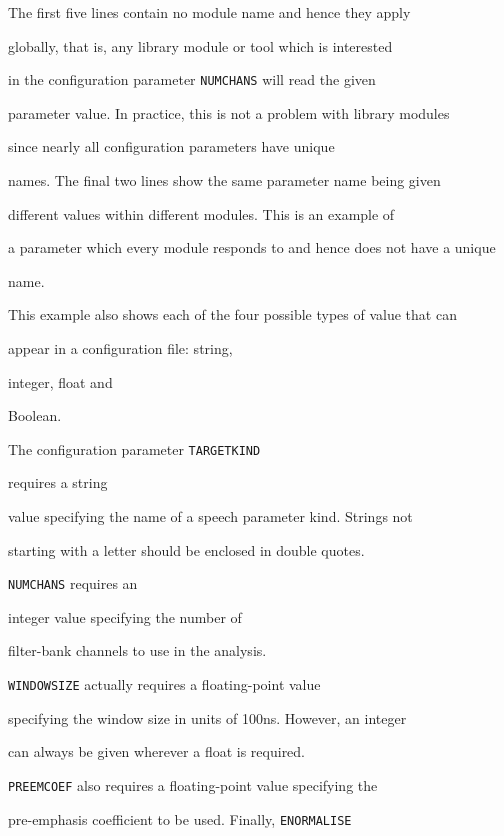 The first five lines contain no module name and hence they apply


globally, that is, any library module or tool which is interested


in the configuration parameter \texttt{NUMCHANS} will read the given


parameter value.  In practice, this is not a problem with library modules


since nearly all configuration parameters have unique


names.  The final two lines show the same parameter name being given


different values within different modules.  This is an example of


a parameter which every module responds to and hence does not have a unique


name.





This example also shows each of the four possible types of value that can


appear in a configuration file: string, 


integer, float and 


Boolean.


The configuration parameter \texttt{TARGETKIND}


 requires a string


value specifying the name of a speech parameter kind. Strings not


starting with a letter should be enclosed in double quotes. 


\texttt{NUMCHANS}  requires an 


integer value specifying the number of


filter-bank channels to use in the analysis.


\texttt{WINDOWSIZE}  actually requires a floating-point value


specifying  the window size in units of 100ns.  However, an integer


can always be given wherever a float is required.


\texttt{PREEMCOEF} also requires a floating-point  value specifying the


pre-emphasis coefficient to be used.  Finally, \texttt{ENORMALISE}


